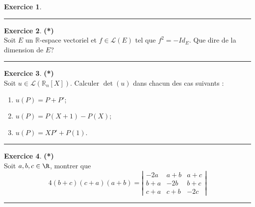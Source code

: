 \documentclass[a4paper,11pt]{article}
\theoremstyle{definition}
\newtheorem{exo}{Exercice} %
\begin{document}
\begin{minipage}{1\linewidth}
\begin{minipage}[t]{0.48\linewidth}
\begin{exo}
	\centering\rule{1\linewidth}{0.6pt}\end{exo}




\end{minipage}\hfill\vrule\hfill\begin{minipage}[t]{0.48\linewidth}\raggedright

\begin{exo}\textbf{(*)}\quad\\[0.2cm]
Soit $E$ un $\mathbb R$-espace vectoriel et $f\in\mathcal L(E)$ tel que $f^2=-Id_E$. Que dire de la dimension de $E$?

\centering\rule{1\linewidth}{0.6pt}\end{exo}


\begin{exo}\textbf{(*)}\quad\\[0.2cm]
Soit $u\in\mathcal L(\mathbb R_n[X])$. Calculer $\det(u)$ dans chacun des cas suivants :
\begin{enumerate}
	\item $u(P)=P+P'$;
	\item $u(P)=P(X+1)-P(X)$;
	\item $u(P)=XP'+P(1)$.
\end{enumerate}

\centering\rule{1\linewidth}{0.6pt}\end{exo}

\begin{exo}\textbf{(*)}\quad\\[0.2cm]
	Soit $a,b,c \in \R$, montrer que $$4(b+c)(c+a)(a+b) = \left|
	\begin{array}{ccc}
	-2a&a+b&a+c\\
	b+a&-2b&b+c\\
	c+a&c+b&-2c
	\end{array}\right|$$
	
	\centering\rule{1\linewidth}{0.6pt}\end{exo}



\end{minipage}\end{minipage} \newpage
\end{document}
